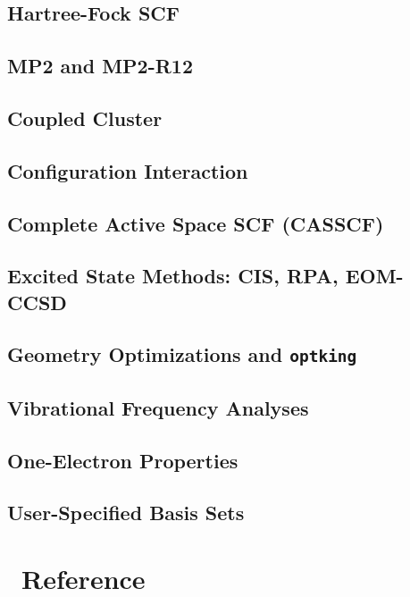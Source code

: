 \documentclass[12pt]{article}
\begin{document}
\subsection{Hartree-Fock SCF}
\subsection{MP2 and MP2-R12}
\subsection{Coupled Cluster}
\subsection{Configuration Interaction}
\subsection{Complete Active Space SCF (CASSCF)}
\subsection{Excited State Methods: CIS, RPA, EOM-CCSD}
\subsection{Geometry Optimizations and {\tt optking}}
\subsection{Vibrational Frequency Analyses}
\subsection{One-Electron Properties}
\subsection{User-Specified Basis Sets}

\newpage
\appendix
\section{\PSIthree\ Reference}\label{PSI_Reference}
%

%



\end{document}
